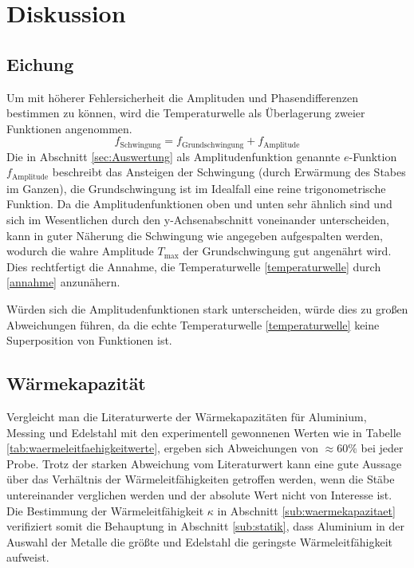 \section{Diskussion}
\label{sec:Diskussion}
\subsection{Eichung}
Um mit höherer Fehlersicherheit die Amplituden und Phasendifferenzen bestimmen zu können, wird die Temperaturwelle als Überlagerung zweier Funktionen angenommen. 
\begin{equation}
	\label{annahme}
	f_\text{Schwingung}= f_\text{Grundschwingung}+f_\text{Amplitude}
\end{equation}
Die in Abschnitt \ref{sec:Auswertung} als Amplitudenfunktion genannte $e$-Funktion $f_\text{Amplitude}$ beschreibt das Ansteigen der Schwingung (durch Erwärmung des Stabes im Ganzen), die Grundschwingung ist im Idealfall eine reine trigonometrische Funktion. 
Da die Amplitudenfunktionen oben und unten sehr ähnlich sind und sich im Wesentlichen durch den y-Achsenabschnitt voneinander unterscheiden, kann in guter Näherung die Schwingung wie angegeben aufgespalten werden, wodurch die wahre Amplitude $T_\text{max}$ der Grundschwingung gut angenährt wird.
Dies rechtfertigt die Annahme, die Temperaturwelle \ref{temperaturwelle} durch \eqref{annahme} anzunähern.

Würden sich die Amplitudenfunktionen stark unterscheiden, würde dies zu großen Abweichungen führen, da die echte Temperaturwelle \ref{temperaturwelle} keine Superposition von Funktionen ist.

\subsection{Wärmekapazität}
Vergleicht man die Literaturwerte der Wärmekapazitäten für Aluminium, Messing und Edelstahl mit den experimentell gewonnenen Werten wie in Tabelle \ref{tab:waermeleitfaehigkeitwerte}, ergeben sich Abweichungen von $\approx60\%$ bei jeder Probe. 
Trotz der starken Abweichung vom Literaturwert kann eine gute Aussage über das Verhältnis der Wärmeleitfähigkeiten getroffen werden, 
wenn die Stäbe untereinander verglichen werden und der absolute Wert nicht von Interesse ist.
Die Bestimmung der Wärmeleitfähigkeit $\kappa$ in Abschnitt \ref{sub:waermekapazitaet} verifiziert somit die Behauptung in Abschnitt \ref{sub:statik}, dass Aluminium in der Auswahl der Metalle die größte und Edelstahl die geringste Wärmeleitfähigkeit aufweist.

